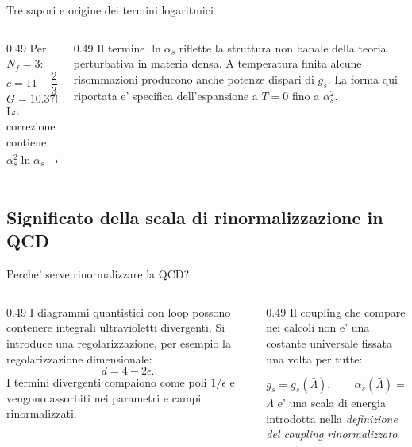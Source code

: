 \begin{frame}{Tre sapori e origine dei termini logaritmici}
\small
\begin{columns}[T,onlytextwidth]
\begin{column}{0.49\textwidth}
Per $N_f=3$:
\[
c=11-\frac23\cdot3=9,
\]
\[
G=10.376-1.608+3\ln3
\simeq12.064.
\]
La correzione contiene
\[
\alpha_s^2\ln\alpha_s
\quad\text{e}\quad
\alpha_s^2\ln(\bar\Lambda/\mu_q).
\]
\end{column}
\begin{column}{0.49\textwidth}
Il termine $\ln\alpha_s$ riflette
la struttura non banale della teoria perturbativa
in materia densa.
\medskip
A temperatura finita alcune risommazioni
producono anche potenze dispari di $g_s$.
\medskip
La forma qui riportata e' specifica
dell'espansione a $T=0$ fino a $\alpha_s^2$.
\end{column}
\end{columns}
\end{frame}

\subsection{Significato della scala di rinormalizzazione in QCD}

\begin{frame}{Perche' serve rinormalizzare la QCD?}
\small
\begin{columns}[T,onlytextwidth]
\begin{column}{0.49\textwidth}
I diagrammi quantistici con loop possono
contenere integrali ultravioletti divergenti.
\medskip
Si introduce una regolarizzazione,
per esempio la regolarizzazione dimensionale:
\[
d=4-2\epsilon.
\]
I termini divergenti compaiono come poli
$1/\epsilon$ e vengono assorbiti nei
parametri e campi rinormalizzati.
\end{column}
\begin{column}{0.49\textwidth}
Il coupling che compare nei calcoli non e'
una costante universale fissata una volta
per tutte:
\[
g_s=g_s(\bar\Lambda),
\qquad
\alpha_s(\bar\Lambda)=\frac{g_s^2(\bar\Lambda)}{4\pi}.
\]
$\bar\Lambda$ e' una scala di energia introdotta
nella \emph{definizione del coupling rinormalizzato}.
\end{column}
\end{columns}
\end{frame}

